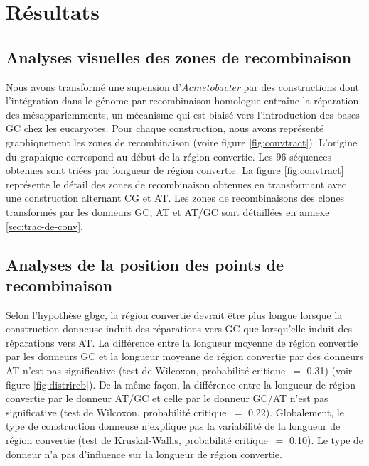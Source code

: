 \section{Résultats}
\label{sec:resultats}


\subsection{Analyses visuelles des zones de recombinaison}
\label{subsec:visu}

Nous avons transformé une supension d'\emph{Acinetobacter} par des constructions
dont l'intégration dans le génome par recombinaison homologue entraîne la
réparation des mésappariemments, un mécanisme qui est biaisé vers l'introduction
des bases GC chez les eucaryotes. Pour chaque construction, nous avons
représenté graphiquement les zones de recombinaison (voire figure
\ref{fig:convtract}). L'origine du graphique correspond au début de la région
convertie. Les 96 séquences obtenues sont triées par longueur de région
convertie. La figure \ref{fig:convtract} représente le détail des zones de
recombinaison obtenues en transformant avec une construction alternant CG et AT.
Les zones de recombinaisons des clones transformés par les donneurs GC, AT et
AT/GC sont détaillées en annexe \ref{sec:trac-de-conv}.

\subsection{Analyses de la position des points de recombinaison}
\label{subsec:distribution-points}

Selon l'hypothèse \ac{gbgc}, la région convertie devrait être plus longue
lorsque la construction donneuse induit des réparations vers GC que lorsqu'elle
induit des réparations vers AT. La différence entre la longueur moyenne de
région convertie par les donneurs GC et la longueur moyenne de région convertie
par des donneurs AT n'est pas significative (test de Wilcoxon, probabilité
critique~\(=\) \num{0.31}) (voir figure \ref{fig:distrircb}). De la même façon, la
différence entre la longueur de région convertie par le donneur AT/GC et celle
par le donneur GC/AT n'est pas significative (test de Wilcoxon, probabilité
critique~\(=\) \num{0.22}). Globalement, le type de construction donneuse n'explique
pas la variabilité de la longueur de région convertie (test de Kruskal-Wallis,
probabilité critique~\(=\) \num{0.10}). Le type de donneur n'a pas d'influence sur la
longueur de région convertie.

